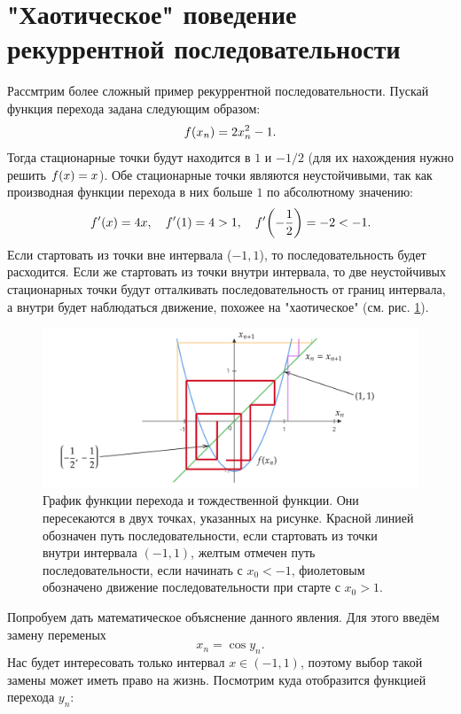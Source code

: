 \documentclass[12pt]{article}
\begin{document}
\section{"Хаотическое"{} поведение рекуррентной последовательности}
Рассмтрим более сложный пример рекуррентной последовательности. Пускай функция перехода задана следующим образом:
\begin{equation}
    f\qty(x_{n}) = 2x_n^2 - 1.
\end{equation}
Тогда стационарные точки будут находится в $1$ и $-1/2$ (для их нахождения нужно решить $f\qty(x) = x$). Обе стационарные точки являются неустойчивыми, так как производная функции перехода в них больше $1$ по абсолютному значению:
\begin{equation}
    f'\qty(x) = 4x, \quad f'\qty(1) = 4 > 1, \quad  f'\qty(-\dfrac{1}{2}) = -2 < -1.
\end{equation}
Если стартовать из точки вне интервала ($-1,1$), то последовательность будет расходится. Если же стартовать из точки внутри интервала, то две неустойчивых стационарных точки будут отталкивать последовательность от границ интервала, а внутри будет наблюдаться движение, похожее на "{}хаотическое"{} (см. рис. \ref{fig:10}).
\begin{figure}[ht]
    \centering
    \includegraphics[width = 1\textwidth]{fig10.png}
    \caption{График функции перехода и тождественной функции. Они пересекаются в двух точках, указанных на рисунке. Красной линией обозначен путь последовательности, если стартовать из точки внутри интервала $(-1,1)$, желтым отмечен путь последовательности, если начинать с $x_0 < -1$, фиолетовым обозначено движение последовательности при старте с $x_0 > 1$.}
    \label{fig:10}
\end{figure}
Попробуем дать математическое объяснение данного явления. Для этого введём замену переменых
\begin{equation}
    x_n = \cos{y_n}.
\end{equation}
Нас будет интересовать только интервал $x\in (-1,1)$, поэтому выбор такой замены может иметь право на жизнь. Посмотрим куда отобразится функцией перехода $y_n$:
\end{document}
